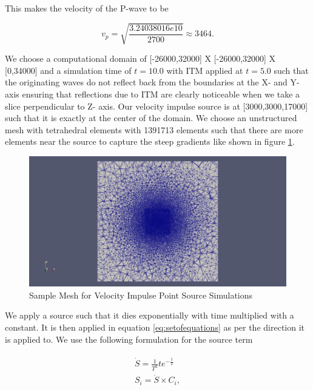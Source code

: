 This makes the velocity of the P-wave to be

\begin{equation}
    v_p = \sqrt{\frac{3.24038016e10}{2700}} \approx 3464 .
\end{equation}

We choose a computational domain of [-26000,32000] X [-26000,32000] X [0,34000] and a simulation time of $t=10.0$ with \ac{ITM} applied at $t=5.0$ 
such that the originating waves do not reflect back from the boundaries at the X- and Y- axis ensuring that
reflections due to \ac{ITM} are clearly noticeable when we take a slice perpendicular to Z- axis. 
Our velocity impulse source is at [3000,3000,17000] such that it is exactly at the center of the domain. 
We choose an unstructured mesh with tetrahedral elements with 1391713 elements such that there are more elements near the source to capture the steep gradients like shown in 
figure \ref{fig:mesh-loh1}.

\begin{figure}
    \centering
    \includegraphics[width=\linewidth]{figures/mesh_loh1.png}
    \caption{Sample Mesh for Velocity Impulse Point Source Simulations}
    \label{fig:mesh-loh1}
\end{figure}

We apply a source such that it dies exponentially with time multiplied with a constant. It is then applied in equation \ref{eq:setofequations} as per the direction
it is applied to. We use the following formulation for the source term

\begin{align}
    \begin{split}
        \dot{S} = \frac{1}{T^2} t e^{-\frac{t}{T}} \\
        S_i = \dot{S} \times C_i ,
    \end{split}
    \label{eq:source}
\end{align}

